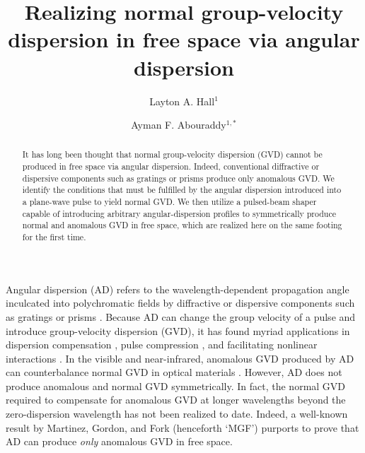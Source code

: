 \documentclass[reprint,
 amsmath,amssymb,
 aps,
]{revtex4-2}
\begin{document}

\title{Realizing normal group-velocity dispersion in free space via angular dispersion}

\author{Layton A. Hall$^{1}$}
\author{Ayman F. Abouraddy$^{1,*}$}

\begin{abstract}
It has long been thought that normal group-velocity dispersion (GVD) cannot be produced in free space via angular dispersion. Indeed, conventional diffractive or dispersive components such as gratings or prisms produce only anomalous GVD. We identify the conditions that must be fulfilled by the angular dispersion introduced into a plane-wave pulse to yield normal GVD. We then utilize a pulsed-beam shaper capable of introducing arbitrary angular-dispersion profiles to symmetrically produce normal and anomalous GVD in free space, which are realized here on the same footing for the first time.
\end{abstract}




\maketitle

Angular dispersion (AD) refers to the wavelength-dependent propagation angle inculcated into polychromatic fields by diffractive or dispersive components such as gratings or prisms \cite{Torres10AOP,Fulop10Review}. Because AD can change the group velocity of a pulse and introduce group-velocity dispersion (GVD), it has found myriad applications in dispersion compensation \cite{Fork84OL,Gordon84OL}, pulse compression \cite{Lemoff93OL,Kane97JOSAB}, and facilitating nonlinear interactions \cite{Hebling02OE}. In the visible and near-infrared, anomalous GVD produced by AD can counterbalance normal GVD in optical materials \cite{Szatmari90AO,Szatmari96OL,Sonajalg96OL,Sonajalg97OL}. However, AD does not produce anomalous and normal GVD symmetrically. In fact, the normal GVD required to compensate for anomalous GVD at longer wavelengths beyond the zero-dispersion wavelength has not been realized to date. Indeed, a well-known result by Martinez, Gordon, and Fork (henceforth `MGF') \cite{Martinez84JOSAA} purports to prove that AD can produce \textit{only} anomalous GVD in free space.
\end{document}
